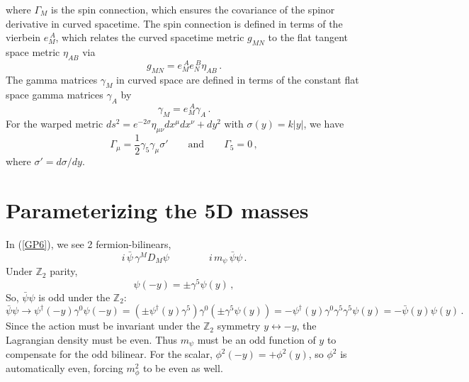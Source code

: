 \documentclass[11pt]{article}
\begin{document}
where $\Gamma_M$ is the spin connection, which ensures the covariance of the spinor derivative in curved spacetime. The spin connection is defined in terms of the vierbein $e_M^{\ A}$, which relates the curved spacetime metric $g_{MN}$ to the flat tangent space metric $\eta_{AB}$ via
\begin{equation}
g_{MN} = e_M^{\ A} e_N^{\ B} \eta_{AB} \, .
\end{equation}
The gamma matrices $\gamma_M$ in curved space are defined in terms of the constant flat space gamma matrices $\gamma_A$ by
\begin{equation}
\gamma_M = e_M^{\ A} \gamma_A \, .
\end{equation} For the warped metric $ds^2 = e^{-2\sigma}\eta_{\mu\nu}dx^\mu dx^\nu + dy^2$ with $\sigma(y)=k|y|$, we have
\begin{equation}
\Gamma_\mu = \frac{1}{2}\gamma_5\gamma_\mu \sigma'
\qquad \text{and} \qquad
\Gamma_5 = 0 \, ,
\end{equation}
where $\sigma' = d\sigma/dy$.

\section{Parameterizing the 5D masses}

In (\ref{GP6}), we see 2 fermion-bilinears,
\begin{equation}
i\,\bar\psi\,\gamma^{M}D_{M}\psi
\qquad\qquad
i\,m_\psi\,\bar\psi\psi \, .
\end{equation}
Under $\mathbb{Z}_2$ parity,
\begin{equation}
\psi(-y)=\pm \gamma^{5}\psi(y) \, ,
\end{equation}
So, $\bar \psi\psi$ is odd under the $\mathbb{Z}_2$:
\begin{equation}
\bar{\psi}\psi \to \psi^\dagger(-y)\gamma^0 \psi(-y) = (\pm \psi^\dagger(y) \gamma^5)\gamma^0 (\pm \gamma^5 \psi(y)) = - \psi^\dagger(y) \gamma^0 \gamma^5 \gamma^5 \psi(y) = -\bar{\psi}(y)\psi(y) \, .
\end{equation}
Since the action must be invariant under the $\mathbb{Z}_2$ symmetry $y \leftrightarrow -y$, the Lagrangian density must be even. Thus $m_\psi$ must be an odd function of $y$ to compensate for the odd bilinear. For the scalar, $\phi^2(-y)=+\phi^2(y)$, so $\phi^2$ is automatically even, forcing $m_\phi^2$ to be even as well.
\end{document}
